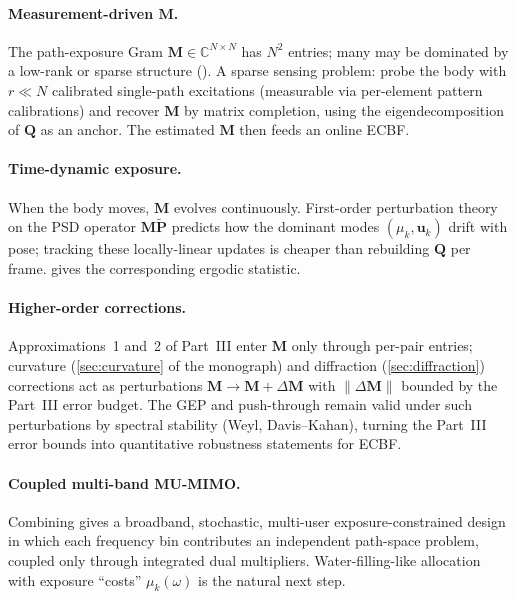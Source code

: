 \documentclass[11pt,a4paper]{article}
\theoremstyle{definition}
\newcommand{\Complex}{\mathbb{C}}
\newcommand{\Mmat}{\mathbf{M}}                 %
\newcommand{\Qmat}{\mathbf{Q}}                 %
\newcommand{\Pmat}{\tilde{\mathbf{P}}}         %
\newcommand{\uu}{\mathbf{u}}
\begin{document}
\paragraph{Measurement-driven $\Mmat$.}  The path-exposure Gram
$\Mmat\in\Complex^{N\times N}$ has $N^2$ entries; many may be dominated
by a low-rank or sparse structure ().  A sparse
sensing problem: probe the body with $r\ll N$ calibrated single-path
excitations (measurable via per-element pattern calibrations) and recover
$\Mmat$ by matrix completion, using the eigendecomposition of $\Qmat$ as
an anchor.  The estimated $\Mmat$ then feeds an online ECBF.

\paragraph{Time-dynamic exposure.}  When the body moves, $\Mmat$ evolves
continuously.  First-order perturbation theory on the PSD operator
$\Mmat\Pmat$ predicts how the dominant modes $(\mu_k,\uu_k)$ drift with
pose; tracking these locally-linear updates is cheaper than rebuilding
$\Qmat$ per frame.   gives the corresponding
ergodic statistic.

\paragraph{Higher-order corrections.}  Approximations~1 and~2 of
Part~III enter $\Mmat$ only through per-pair entries; curvature
(\cref{sec:curvature} of the monograph) and diffraction
(\cref{sec:diffraction}) corrections act as perturbations
$\Mmat\to\Mmat+\Delta\Mmat$ with $\|\Delta\Mmat\|$ bounded by the Part~III
error budget.  The GEP and push-through remain valid under such
perturbations by spectral stability (Weyl, Davis--Kahan), turning the
Part~III error bounds into quantitative robustness statements for ECBF.

\paragraph{Coupled multi-band MU-MIMO.}  Combining
 gives a broadband, stochastic,
multi-user exposure-constrained design in which each frequency bin
contributes an independent path-space problem, coupled only through
integrated dual multipliers.  Water-filling-like allocation with
exposure ``costs'' $\mu_k(\omega)$ is the natural next step.
\end{document}
